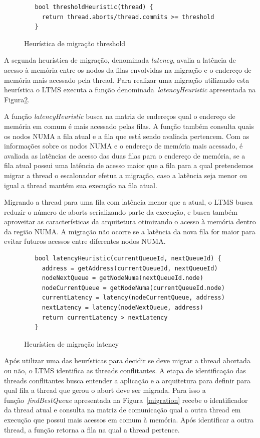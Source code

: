\documentclass[diss,capa]{texufpel}
\begin{document}
\begin{figure}[htbp]
 \centering
 \begin{lstlisting}
   bool thresholdHeuristic(thread) {
     return thread.aborts/thread.commits >= threshold
   }
 \end{lstlisting}
 \caption{Heurística de migração threshold}
 \label{threshold}
\end{figure}

A segunda heurística de migração, denominada \emph{latency}, avalia a latência de acesso à memória entre os nodos da filas envolvidas na migração e o endereço de memória mais acessado pela thread. Para realizar uma migração utilizando esta heurística o LTMS executa a função denominada~\emph{latencyHeuristic} apresentada na Figura\ref{latency}.

A função \emph{latencyHeuristic} busca na matriz de endereços qual o endereço de memória em comum é mais acessado pelas filas. A função também consulta quais os nodos NUMA a fila atual e a fila que está sendo avaliada pertencem. Com as informações sobre os nodos NUMA e o endereço de memória mais acessado, é avaliada as latências de acesso das duas filas para o endereço de memória, se a fila atual possui uma latência de acesso maior que a fila para a qual pretendemos migrar a thread o escalonador efetua a migração, caso a latência seja menor ou igual a thread mantém sua execução na fila atual.

Migrando a thread para uma fila com latência menor que a atual, o LTMS busca reduzir o número de aborts serializando parte da execução, e busca também aproveitar as características da arquitetura otimizando o acesso à memória dentro da região NUMA. A migração não ocorre se a latência da nova fila for maior para evitar futuros acessos entre diferentes nodos NUMA.

\begin{figure}[htbp]
 \centering
 \begin{lstlisting}
   bool latencyHeuristic(currentQueueId, nextQueueId) {
     address = getAddress(currentQueueId, nextQueueId)
     nodeNextQueue = getNodeNuma(nextQueueId.node)
     nodeCurrentQueue = getNodeNuma(currentQueueId.node)
     currentLatency = latency(nodeCurrentQueue, address)
     nextLatency = latency(nodeNextQueue, address)
     return currentLatency > nextLatency
   }
 \end{lstlisting}
 \caption{Heurística de migração latency}
\label{latency}
\end{figure}

Após utilizar uma das heurísticas para decidir se deve migrar a thread abortada ou não, o LTMS identifica as threads conflitantes. A etapa de identificação das threads conflitantes busca entender a aplicação e a arquitetura para definir para qual fila a thread que gerou o abort deve ser migrada. Para isso a função~\emph{findBestQueue} apresentada na Figura~\ref{migration} recebe o identificador da thread atual e consulta na matriz de comunicação qual a outra thread em execução que possui mais acessos em comum à memória. Após identificar a outra thread, a função retorna a fila na qual a thread pertence.
\end{document}
